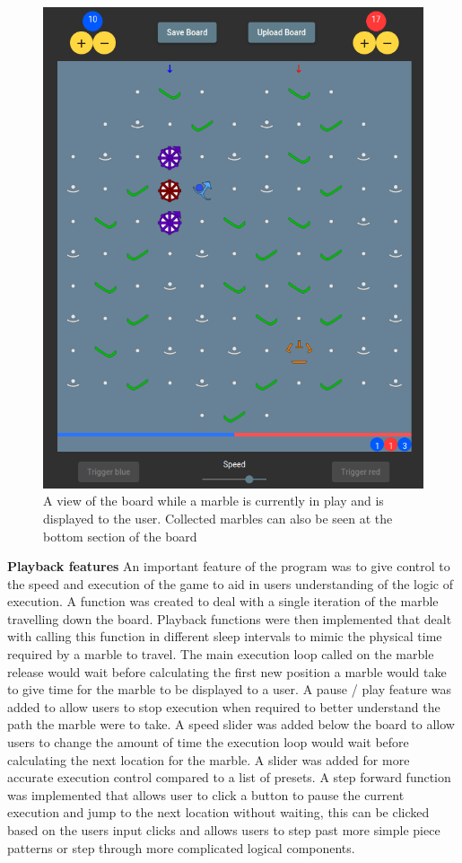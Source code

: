 \documentclass{l4proj}
\begin{document}
\begin{figure}
    \centering
    \includegraphics[width=0.7\linewidth]{images/marbleInPlay.png}
    \caption{A view of the board while a marble is currently in play and is displayed to the user. Collected marbles can also be seen at the bottom section of the board}
    \label{fig:marbleInPlay}
\end{figure}

\textbf{Playback features}
An important feature of the program was to give control to the speed and execution of the game to aid in users understanding of the logic of execution. A function was created to deal with a single iteration of the marble travelling down the board. Playback functions were then implemented that dealt with calling this function in different sleep intervals to mimic the physical time required by a marble to travel. The main execution loop called on the marble release would wait before calculating the first new position a marble would take to give time for the marble to be displayed to a user. A pause / play feature was added to allow users to stop execution when required to better understand the path the marble were to take. A speed slider was added below the board to allow users to change the amount of time the execution loop would wait before calculating the next location for the marble. A slider was added for more accurate execution control compared to a list of presets. A step forward function was implemented that allows user to click a button to pause the current execution and jump to the next location without waiting, this can be clicked based on the users input clicks and allows users to step past more simple piece patterns or step through more complicated logical components. 
\end{document}
